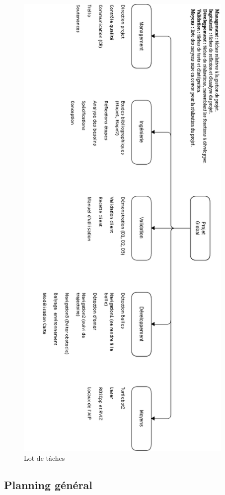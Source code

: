\documentclass[10pt,a4paper]{article}
\begin{document}
\begin{figure}
  \centering
\noindent\includegraphics[width=10.5cm]{lottaches.png} 
  \caption{Lot de tâches}
\end{figure}

\subsection{Planning général}
\end{document}
